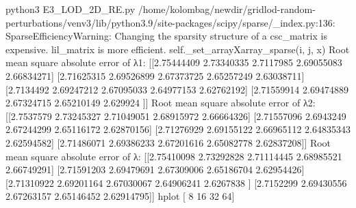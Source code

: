 python3 E3_LOD_2D_RE.py
/home/kolombag/newdir/gridlod-random-perturbations/venv3/lib/python3.9/site-packages/scipy/sparse/_index.py:136: SparseEfficiencyWarning: Changing the sparsity structure of a csc_matrix is expensive. lil_matrix is more efficient.
  self._set_arrayXarray_sparse(i, j, x)
Root mean square absolute error of λ1:
 [[2.75444409 2.73340335 2.7117985  2.69055083 2.66834271]
 [2.71625315 2.69526899 2.67373725 2.65257249 2.63038711]
 [2.7134492  2.69247212 2.67095033 2.64977153 2.62762192]
 [2.71559914 2.69474889 2.67324715 2.65210149 2.629924  ]]
Root mean square absolute error of λ2: 
 [[2.7537579  2.73245327 2.71049051 2.68915972 2.66664326]
 [2.71557096 2.6943249  2.67244299 2.65116172 2.62870156]
 [2.71276929 2.69155122 2.66965112 2.64835343 2.62594582]
 [2.71486071 2.69386233 2.67201616 2.65082778 2.62837208]]
Root mean square absolute error of λ: 
 [[2.75410098 2.73292828 2.71114445 2.68985521 2.66749291]
 [2.71591203 2.69479691 2.67309006 2.65186704 2.62954426]
 [2.71310922 2.69201164 2.67030067 2.64906241 2.6267838 ]
 [2.7152299  2.69430556 2.67263157 2.65146452 2.62914795]]
hplot [ 8 16 32 64]